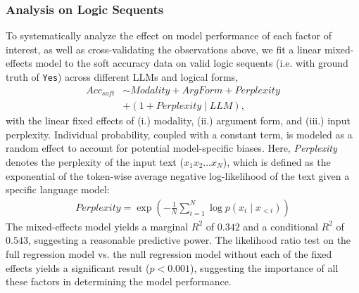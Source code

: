 \subsubsection{Analysis on Logic Sequents}
To systematically analyze the effect on model performance of each factor of interest, as well as cross-validating the observations above, we fit a linear mixed-effects model \citep{raudenbush-2002-hierarchical} to the soft accuracy data on valid logic sequents (i.e. with ground truth of \texttt{Yes}) across different LLMs and logical forms,
\begin{align}
    \mathit{Acc}_\textit{soft} & \sim \textit{Modality} + \textit{ArgForm} + \textit{Perplexity} \nonumber \\
                               & + (1 + \textit{Perplexity} \mid \textit{LLM}),
    \label{eqn: mixed-effects}
\end{align}
with the linear fixed effects of (i.) modality, (ii.) argument form, and (iii.) input perplexity.
Individual probability, coupled with a constant term, is modeled as a random effect to account for potential model-specific biases.
Here, \textit{Perplexity} denotes the perplexity of the input text ($x_1x_2\dots x_N$), which is defined as the exponential of the token-wise average negative log-likelihood of the text given a specific language model:
\begin{align*}
    \textit{Perplexity} = \exp\left(-\frac{1}{N}\sum_{i=1}^{N}\log p(x_i \mid x_{<i})\right)
\end{align*}
The mixed-effects model yields a marginal $R^2$ of $0.342$ and a conditional $R^2$ of $0.543$, suggesting a reasonable predictive power.
The likelihood ratio test on the full regression model vs. the null regression model without each of the fixed effects yields a significant result ($p<0.001$), suggesting the importance of all these factors in determining the model performance.


